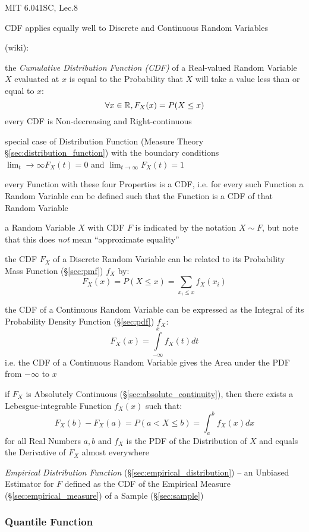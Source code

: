 MIT 6.041SC, Lec.8

CDF applies equally well to Discrete and Continuous Random Variables

(wiki):

the \emph{Cumulative Distribution Function (CDF)} of a Real-valued Random
Variable $X$ evaluated at $x$ is equal to the Probability that $X$ will take a
value less than or equal to $x$:
\[
  \forall x \in \mathbb{R}, F_X(x) = P(X \leq x)
\]
every CDF is Non-decreasing and Right-continuous

special case of Distribution Function (Measure Theory
\S\ref{sec:distribution_function}) with the boundary conditions
$\lim_t\rightarrow\infty F_X(t) = 0$ and $\lim_{t\rightarrow\infty}F_X(t) = 1$

every Function with these four Properties is a CDF, i.e. for every such Function
a Random Variable can be defined such that the Function is a CDF of that Random
Variable

a Random Variable $X$ with CDF $F$ is indicated by the notation $X \sim F$, but
note that this does \emph{not} mean ``approximate equality''

the CDF $F_X$ of a Discrete Random Variable can be related to its Probability
Mass Function (\S\ref{sec:pmf}) $f_X$ by:
\[
  F_X(x) = P(X \leq x) = \sum_{x_i \leq x} f_X(x_i)
\]

the CDF of a Continuous Random Variable can be expressed as the Integral of its
Probability Density Function (\S\ref{sec:pdf}) $f_X$:
\[
  F_X(x) = \int\limits_{-\infty}^x f_X(t) dt
\]
i.e. the CDF of a Continuous Random Variable gives the Area under the PDF from
$-\infty$ to $x$

if $F_X$ is Absolutely Continuous (\S\ref{sec:absolute_continuity}), then there
exists a Lebesgue-integrable Function $f_X(x)$ such that:
\[
  F_X(b) - F_X(a) = P(a < X \leq b) = \int_a^b f_X(x) dx
\]
for all Real Numbers $a, b$ and $f_X$ is the PDF of the Distribution of $X$
and equals the Derivative of $F_X$ almost everywhere

\fist \emph{Empirical Distribution Function}
(\S\ref{sec:empirical_distribution}) -- an Unbiased Estimator for $F$ defined as
the CDF of the Empirical Measure (\S\ref{sec:empirical_measure}) of a Sample
(\S\ref{sec:sample})



\subsubsection{Quantile Function}\label{sec:quantile_function}

